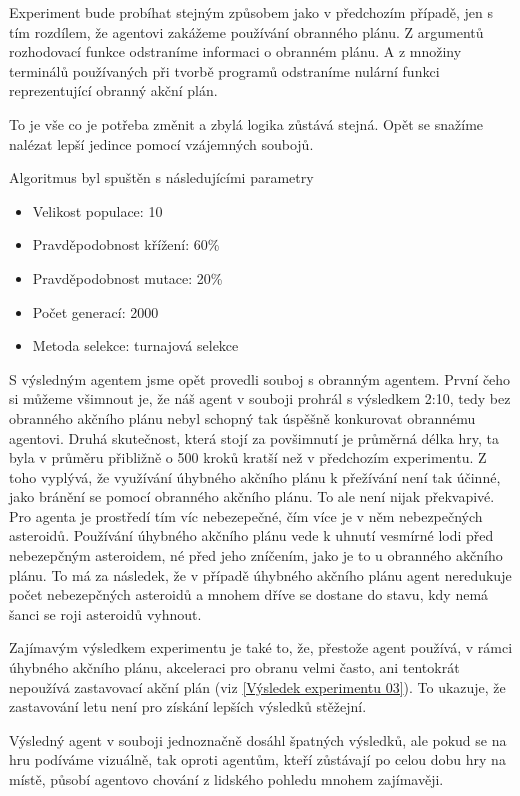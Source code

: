 \par
Experiment bude probíhat stejným způsobem jako v předchozím případě, jen s tím rozdílem, že agentovi zakážeme používání obranného plánu. 
Z argumentů rozhodovací funkce odstraníme informaci o obranném plánu. 
A z množiny terminálů používaných při tvorbě programů odstraníme nulární funkci reprezentující obranný akční plán.

\par
To je vše co je potřeba změnit a zbylá logika zůstává stejná. Opět se snažíme nalézat lepší jedince pomocí vzájemných soubojů.

Algoritmus byl spuštěn s následujícími parametry
\begin{itemize}
    \item Velikost populace: 10
    \item Pravděpodobnost křížení: 60\%
    \item Pravděpodobnost mutace: 20\%
    \item Počet generací: 2000
    \item Metoda selekce: turnajová selekce
\end{itemize}

S výsledným agentem jsme opět provedli souboj s obranným agentem.
První čeho si můžeme všimnout je, že náš agent v souboji prohrál s výsledkem 2:10, tedy bez obranného akčního plánu nebyl schopný tak úspěšně konkurovat obrannému agentovi.
Druhá skutečnost, která stojí za povšimnutí je průměrná délka hry, ta byla v průměru přibližně o 500 kroků kratší než v předchozím experimentu. 
Z toho vyplývá, že využívání úhybného akčního plánu k přežívání není tak účinné, jako bránění se pomocí obranného akčního plánu. 
To ale není nijak překvapivé. Pro agenta je prostředí tím víc nebezepečné, čím více je v něm nebezpečných asteroidů. 
Používání úhybného akčního plánu vede k uhnutí vesmírné lodi před nebezepčným asteroidem, né před jeho zníčením, jako je to u obranného akčního plánu. To má za následek, že v případě úhybného akčního plánu agent neredukuje počet nebezepčných asteroidů a mnohem dříve se dostane do stavu, kdy nemá šanci se roji asteroidů vyhnout. 

\par
Zajímavým výsledkem experimentu je také to, že, přestože agent používá, v rámci úhybného akčního plánu, akceleraci pro obranu velmi často, ani tentokrát nepoužívá zastavovací akční plán (viz \ref{Výsledek experimentu 03}).
To ukazuje, že zastavování letu není pro získání lepších výsledků stěžejní.
\par
Výsledný agent v souboji jednoznačně dosáhl špatných výsledků, ale pokud se na hru podíváme vizuálně, tak oproti agentům, kteří zůstávají po celou dobu hry na místě, působí agentovo chování z lidského pohledu mnohem zajímavěji.


